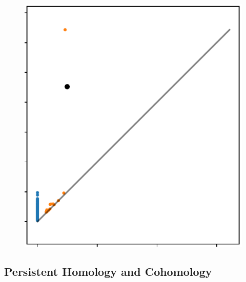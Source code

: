 \begin{figure}[htbp]
     \includegraphics[scale=0.66]{figures/circular_dgm2.pdf}
      \caption{}
      \label{fig:dgm2}
  \end{figure}

\subsection{Persistent Homology and Cohomology}


